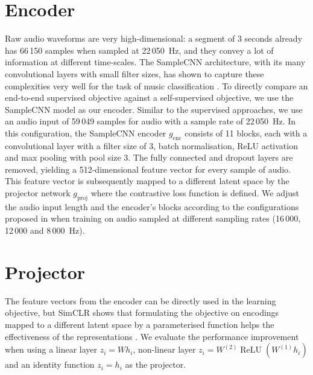 \section{Encoder}
Raw audio waveforms are very high-dimensional: a segment of 3 seconds already has 66\,150 samples when sampled at 22\,050~Hz, and they convey a lot of information at different time-scales. The SampleCNN architecture, with its many convolutional layers with small filter sizes, has shown to capture these complexities very well for the task of music classification \cite{lee2018samplecnn}. To directly compare an end-to-end supervised objective against a self-supervised objective, we use the SampleCNN model as our encoder. Similar to the supervised approaches, we use an audio input of 59\,049 samples for audio with a sample rate of 22\,050~Hz. In this configuration, the SampleCNN encoder $g_{\mathrm{enc}}$ consists of 11 blocks, each with a convolutional layer with a filter size of 3, batch normalisation, ReLU activation and max pooling with pool size 3. The fully connected and dropout layers are removed, yielding a 512-dimensional feature vector for every sample of audio. This feature vector is subsequently mapped to a different latent space by the projector network $g_{\mathrm{proj}}$ where the contrastive loss function is defined. We adjust the audio input length and the encoder's blocks according to the configurations proposed in \cite{lee2018samplecnn} when training on audio sampled at different sampling rates (16\,000, 12\,000 and 8\,000~Hz).



\section{Projector}
The feature vectors from the encoder can be directly used in the learning objective, but SimCLR shows that formulating the objective on encodings mapped to a different latent space by a parameterised function helps the effectiveness of the representations \cite{chen_simple_2020}. We evaluate the performance improvement when using a linear layer $z_i = Wh_i$, non-linear layer $z_i = W^{(2)}\operatorname{ReLU}(W^{(1)}h_i)$ and an identity function $z_i = h_i$ as the projector.


